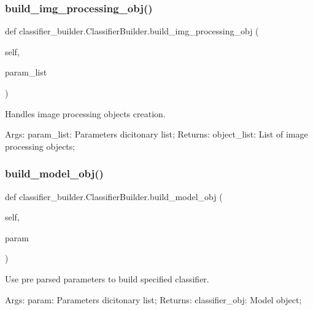 \subsubsection{\texorpdfstring{build\+\_\+img\+\_\+processing\+\_\+obj()}{build\_img\_processing\_obj()}}
{\footnotesize\ttfamily def classifier\+\_\+builder.\+Classifier\+Builder.\+build\+\_\+img\+\_\+processing\+\_\+obj (\begin{DoxyParamCaption}\item[{}]{self,  }\item[{}]{param\+\_\+list }\end{DoxyParamCaption})}



Handles image processing objects creation. 

Args\+: param\+\_\+list\+: Parameters dicitonary list; Returns\+: object\+\_\+list\+: List of image processing objects; \mbox{\label{classclassifier__builder_1_1_classifier_builder_a2a0e440e5571f9b38fc72ecc5b649031}} 
\subsubsection{\texorpdfstring{build\+\_\+model\+\_\+obj()}{build\_model\_obj()}}
{\footnotesize\ttfamily def classifier\+\_\+builder.\+Classifier\+Builder.\+build\+\_\+model\+\_\+obj (\begin{DoxyParamCaption}\item[{}]{self,  }\item[{}]{param }\end{DoxyParamCaption})}



Use pre parsed parameters to build specified classifier. 

Args\+: param\+: Parameters dicitonary list; Returns\+: classifier\+\_\+obj\+: Model object; \mbox{\label{classclassifier__builder_1_1_classifier_builder_aba174f3d7f78237e9a1bc53c8cb61109}} 
